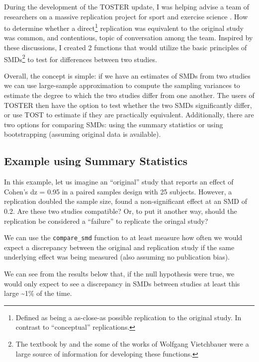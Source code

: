 \documentclass[]{interact}
\theoremstyle{plain}%
\theoremstyle{definition}
\theoremstyle{remark}
\begin{document}
During the development of the TOSTER update, I was helping advise a team
of researchers on a massive replication project for sport and exercise
science \citep{repSES}. How to determine whether a direct\footnote{Defined
  as being a as-close-as possible replication to the original study. In
  contrast to ``conceptual'' replications.} replication was equivalent
to the original study was common, and contentious, topic of conversation
among the team. Inspired by these discussions, I created 2 functions
that would utilize the basic principles of SMDs\footnote{The textbook by
  \citet{borenstein} and the some of the works of Wolfgang Vietchbauer
  were a large source of information for developing these functions.} to
test for differences between two studies.

Overall, the concept is simple: if we have an estimates of SMDs from two
studies we can use large-sample approximation to compute the sampling
variances to estimate the degree to which the two studies differ from
one another. The users of TOSTER then have the option to test whether
the two SMDs significantly differ, or use TOST to estimate if they are
practically equivalent. Additionally, there are two options for
comparing SMDs: using the summary statistics or using bootstrapping
(assuming original data is available).

\hypertarget{example-using-summary-statistics}{%
\subsection{Example using Summary
Statistics}\label{example-using-summary-statistics}}

In this example, let us imagine an ``original'' study that reports an
effect of Cohen's dz = 0.95 in a paired samples design with 25 subjects.
However, a replication doubled the sample size, found a non-significant
effect at an SMD of 0.2. Are these two studies compatible? Or, to put it
another way, should the replication be considered a ``failure'' to
replicate the oringal study?

We can use the \texttt{compare\_smd} function to at least measure how
often we would expect a discrepancy between the original and replication
study if the same underlying effect was being measured (also assuming no
publication bias).

We can see from the results below that, if the null hypothesis were
true, we would only expect to see a discrepancy in SMDs between studies
at least this large \textasciitilde1\% of the time.
\end{document}

